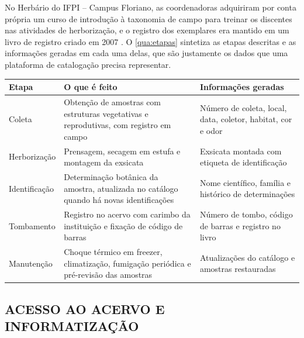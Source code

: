 \documentclass[
    12pt,        %
    openany,     %
    oneside,     %
    a4paper,     %
    english,     %
    french,      %
    spanish,     %
    brazil,      %
    article      %
]{abntex2}
\begin{document}
No Herbário do IFPI -- Campus Floriano, as coordenadoras adquiriram por conta própria um curso de introdução à taxonomia de campo para treinar os discentes nas atividades de herborização, e o registro dos exemplares era mantido em um livro de registro criado em 2007 \cite{lopes2023herbario}. O \autoref{qua:etapas} sintetiza as etapas descritas e as informações geradas em cada uma delas, que são justamente os dados que uma plataforma de catalogação precisa representar.

\begin{quadro}[H]
    \centering
    \caption{Etapas do tratamento do material botânico e informações geradas}
    \label{qua:etapas}
    \small
    \begin{tabularx}{\textwidth}{|p{3cm}|X|X|}
        \hline
        \textbf{Etapa} & \textbf{O que é feito} & \textbf{Informações geradas} \\
        \hline
        Coleta & Obtenção de amostras com estruturas vegetativas e reprodutivas, com registro em campo & Número de coleta, local, data, coletor, habitat, cor e odor \\ \hline
        Herborização & Prensagem, secagem em estufa e montagem da exsicata & Exsicata montada com etiqueta de identificação \\ \hline
        Identificação & Determinação botânica da amostra, atualizada no catálogo quando há novas identificações & Nome científico, família e histórico de determinações \\ \hline
        Tombamento & Registro no acervo com carimbo da instituição e fixação de código de barras & Número de tombo, código de barras e registro no livro \\ \hline
        Manutenção & Choque térmico em freezer, climatização, fumigação periódica e pré-revisão das amostras & Atualizações do catálogo e amostras restauradas \\ \hline
    \end{tabularx}
\end{quadro}

\subsection{ACESSO AO ACERVO E INFORMATIZAÇÃO}
\label{subsec:acesso-informatizacao}
\end{document}

